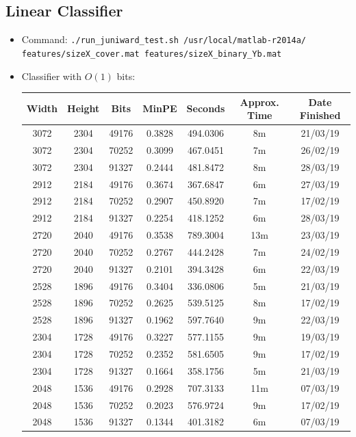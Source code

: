 \documentclass[11pt,a4paper]{report}
\begin{document}
\subsection{Linear Classifier}
\begin{itemize}
\item Command: \texttt{./run\_juniward\_test.sh /usr/local/matlab-r2014a/} \\ \texttt{features/sizeX\_cover.mat features/sizeX\_binary\_Yb.mat}

\item Classifier with $O(1)$ bits:
  \begin{center}
  \begin{tabular}{ c c c | c | c c c }
  Width & Height & Bits & MinPE & Seconds & Approx. Time & Date Finished \\ \hline
  3072 & 2304 & 49176 & 0.3828 & 494.0306 & 8m & 21/03/19 \\
  3072 & 2304 & 70252 & 0.3099 & 467.0451 & 7m & 26/02/19 \\
  3072 & 2304 & 91327 & 0.2444 & 481.8472 & 8m & 28/03/19 \\
  2912 & 2184 & 49176 & 0.3674 & 367.6847 & 6m & 27/03/19 \\
  2912 & 2184 & 70252 & 0.2907 & 450.8920 & 7m & 17/02/19 \\
  2912 & 2184 & 91327 & 0.2254 & 418.1252 & 6m & 28/03/19 \\
  2720 & 2040 & 49176 & 0.3538 & 789.3004 & 13m & 23/03/19 \\
  2720 & 2040 & 70252 & 0.2767 & 444.2428 & 7m & 24/02/19 \\
  2720 & 2040 & 91327 & 0.2101 & 394.3428 & 6m & 22/03/19 \\
  2528 & 1896 & 49176 & 0.3404 & 336.0806 & 5m & 21/03/19 \\
  2528 & 1896 & 70252 & 0.2625 & 539.5125 & 8m & 17/02/19 \\
  2528 & 1896 & 91327 & 0.1962 & 597.7640 & 9m & 22/03/19 \\
  2304 & 1728 & 49176 & 0.3227 & 577.1155 & 9m & 19/03/19 \\
  2304 & 1728 & 70252 & 0.2352 & 581.6505 & 9m & 17/02/19 \\
  2304 & 1728 & 91327 & 0.1664 & 358.1756 & 5m & 21/03/19 \\
  2048 & 1536 & 49176 & 0.2928 & 707.3133 & 11m & 07/03/19 \\
  2048 & 1536 & 70252 & 0.2023 & 576.9724 & 9m & 17/02/19 \\
  2048 & 1536 & 91327 & 0.1344 & 401.3182 & 6m & 07/03/19 \\

\end{tabular}
\end{center}
\end{itemize}
\end{document}
